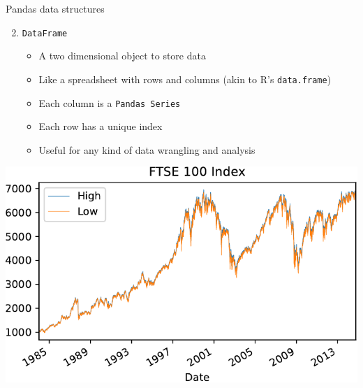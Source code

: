 \documentclass[pdf]{beamer}
\begin{document}
\begin{frame}{Pandas data structures}

\begin{enumerate}
	\setcounter{enumi}{1}
	\item \texttt{DataFrame}
	\begin{itemize}
		\item A two dimensional object to store data
		\item Like a spreadsheet with rows and columns (akin to R's \texttt{data.frame})
		\item Each column is a \texttt{Pandas Series}
		\item Each row has a unique index
		\item Useful for any kind of data wrangling and analysis
	\end{itemize}
\end{enumerate}

\begin{center}
	\includegraphics[width=.7\textwidth]{ftse2.pdf}
\end{center}

\end{frame}
\end{document}
